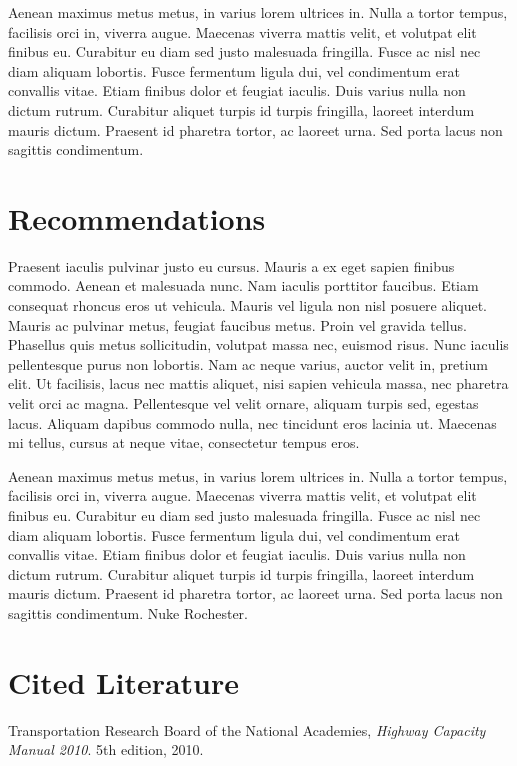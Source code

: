 \documentclass{report}
\begin{document}
Aenean maximus metus metus, in varius lorem ultrices in. Nulla a tortor tempus, facilisis orci in, viverra augue. Maecenas viverra mattis velit, et volutpat elit finibus eu. Curabitur eu diam sed justo malesuada fringilla. Fusce ac nisl nec diam aliquam lobortis. Fusce fermentum ligula dui, vel condimentum erat convallis vitae. Etiam finibus dolor et feugiat iaculis. Duis varius nulla non dictum rutrum. Curabitur aliquet turpis id turpis fringilla, laoreet interdum mauris dictum. Praesent id pharetra tortor, ac laoreet urna. Sed porta lacus non sagittis condimentum.
\noindent\section*{Recommendations}
Praesent iaculis pulvinar justo eu cursus. Mauris a ex eget sapien finibus commodo. Aenean et malesuada nunc. Nam iaculis porttitor faucibus. Etiam consequat rhoncus eros ut vehicula. Mauris vel ligula non nisl posuere aliquet. Mauris ac pulvinar metus, feugiat faucibus metus. Proin vel gravida tellus. Phasellus quis metus sollicitudin, volutpat massa nec, euismod risus. Nunc iaculis pellentesque purus non lobortis. Nam ac neque varius, auctor velit in, pretium elit. Ut facilisis, lacus nec mattis aliquet, nisi sapien vehicula massa, nec pharetra velit orci ac magna. Pellentesque vel velit ornare, aliquam turpis sed, egestas lacus. Aliquam dapibus commodo nulla, nec tincidunt eros lacinia ut. Maecenas mi tellus, cursus at neque vitae, consectetur tempus eros.

Aenean maximus metus metus, in varius lorem ultrices in. Nulla a tortor tempus, facilisis orci in, viverra augue. Maecenas viverra mattis velit, et volutpat elit finibus eu. Curabitur eu diam sed justo malesuada fringilla. Fusce ac nisl nec diam aliquam lobortis. Fusce fermentum ligula dui, vel condimentum erat convallis vitae. Etiam finibus dolor et feugiat iaculis. Duis varius nulla non dictum rutrum. Curabitur aliquet turpis id turpis fringilla, laoreet interdum mauris dictum. Praesent id pharetra tortor, ac laoreet urna. Sed porta lacus non sagittis condimentum.
Nuke Rochester.

\noindent
\section*{Cited Literature}

\begin{thebibliography}{9}
    Transportation Research Board of the National Academies,
    \emph{Highway Capacity Manual 2010}.
    5th edition,
    2010.
\end{thebibliography}
\end{document}
